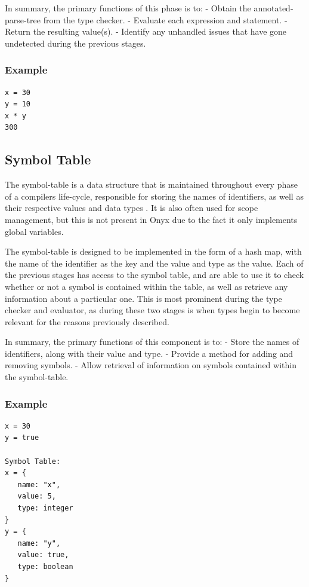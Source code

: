 \documentclass[
]{report}
\begin{document}
In summary, the primary functions of this phase is to: - Obtain the
\gls{annotated-parse-tree} from the type checker. - Evaluate each \gls{expression}
and \gls{statement}. - Return the resulting value(s). - Identify any unhandled
issues that have gone undetected during the previous stages.

\subsubsection{Example}
\begin{verbatim}
x = 30
y = 10
x * y
300
\end{verbatim}

\subsection{Symbol Table}
The \gls{symbol-table} is a data structure that is maintained throughout every
phase of a compilers life-cycle, responsible for storing the names of
\glspl{identifier}, as well as their respective values and data types \cite{tutorials-guide}.
It is also often used for scope management, but this is not present in
Onyx due to the fact it only implements global variables.

The \gls{symbol-table} is designed to be implemented in the form of a hash
map, with the name of the \gls{identifier} as the key and the value and type
as the value. Each of the previous stages has access to the symbol
table, and are able to use it to check whether or not a \gls{symbol} is
contained within the table, as well as retrieve any information about a
particular one. This is most prominent during the type checker and
evaluator, as during these two stages is when types begin to become
relevant for the reasons previously described.

In summary, the primary functions of this component is to: - Store the
names of \glspl{identifier}, along with their value and type. - Provide a
method for adding and removing \glspl{symbol}. - Allow retrieval of information
on \glspl{symbol} contained within the \gls{symbol-table}.

\subsubsection{Example}
\begin{verbatim}
x = 30
y = true

Symbol Table:
x = {
   name: "x",
   value: 5,
   type: integer
}
y = {
   name: "y",
   value: true,
   type: boolean
}
\end{verbatim}
\end{document}
